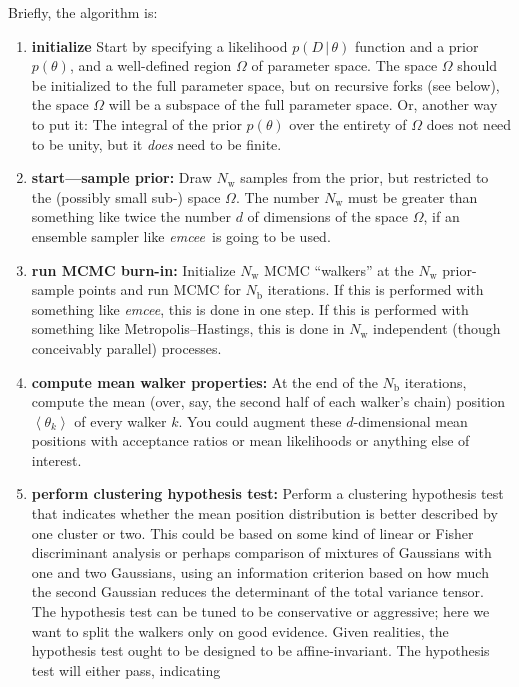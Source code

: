 \documentclass[12pt]{article}
\newcommand{\project}[1]{\textsl{#1}}
\newcommand{\emcee}{\project{emcee}}
\newcommand{\mean}[1]{\left<{#1}\right>}
\newcommand{\given}{\,|\,}
\newcommand{\data}{D}
\newcommand{\pars}{\theta}
\newcommand{\parspace}{\Omega}
\newcommand{\nwalker}{N_{\mathrm{w}}}
\newcommand{\ndim}{d}
\newcommand{\nburn}{N_{\mathrm{b}}}
\begin{document}
Briefly, the algorithm is:
\begin{enumerate}
\item \textbf{initialize} Start by specifying a likelihood
  $p(\data\given\pars)$ function and a prior $p(\pars)$, and a
  well-defined region $\parspace$ of parameter space.  The space
  $\parspace$ should be initialized to the full parameter space, but
  on recursive forks (see below), the space $\parspace$ will be a
  subspace of the full parameter space.  Or, another way to put it:
  The integral of the prior $p(\pars)$ over the entirety of
  $\parspace$ does not need to be unity, but it \emph{does} need to be
  finite.
\item \label{step:start}\textbf{start---sample prior:} Draw $\nwalker$
  samples from the prior, but restricted to the (possibly small sub-)
  space $\parspace$.  The number $\nwalker$ must be greater than
  something like twice the number $\ndim$ of dimensions of the space
  $\parspace$, if an ensemble sampler like \emcee\ is going to be
  used.
\item \textbf{run MCMC burn-in:} Initialize $\nwalker$ MCMC ``walkers''
  at the $\nwalker$ prior-sample points and run MCMC for $\nburn$
  iterations.  If this is performed with something like \emcee, this
  is done in one step.  If this is performed with something like
  Metropolis--Hastings, this is done in $\nwalker$ independent (though
  conceivably parallel) processes.
\item \textbf{compute mean walker properties:} At the end of the
  $\nburn$ iterations, compute the mean (over, say, the second half of
  each walker's chain) position $\mean{\pars_k}$ of every walker $k$.
  You could augment these $\ndim$-dimensional mean positions with
  acceptance ratios or mean likelihoods or anything else of interest.
\item \textbf{perform clustering hypothesis test:} Perform a
  clustering hypothesis test that indicates whether the mean position
  distribution is better described by one cluster or two.  This could
  be based on some kind of linear or Fisher discriminant analysis or
  perhaps comparison of mixtures of Gaussians with one and two
  Gaussians, using an information criterion based on how much the
  second Gaussian reduces the determinant of the total variance
  tensor.  The hypothesis test can be tuned to be conservative or
  aggressive; here we want to split the walkers only on good evidence.
  Given realities, the hypothesis test ought to be designed to be
  affine-invariant. The hypothesis test will either pass, indicating

\end{enumerate}
\end{document}
